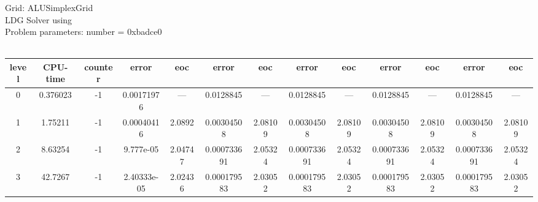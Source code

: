 \documentclass[12pt,english]{article}
\providecommand{\tabularnewline}{\\}
\begin{document}
Grid: ALUSimplexGrid\\
LDG Solver using \\ 
Problem parameters: number = 0xbadce0\\ 
\\ 
\begin{tabular}{|c|c|c||cc||cc||cc||cc||cc|}
\hline 
level & CPU-time & counter & error & eoc  & error & eoc  & error & eoc  & error & eoc  & error & eoc 
 \tabularnewline
\hline
\hline
\hline 
0 & 0.376023 & -1 & 0.00171976 &  ---  & 0.0128845 &  ---  & 0.0128845 &  ---  & 0.0128845 &  ---  & 0.0128845 &  --- 
\tabularnewline
\hline 
\hline 
1 & 1.75211 & -1 & 0.00040416 & 2.0892 & 0.00304508 & 2.08109 & 0.00304508 & 2.08109 & 0.00304508 & 2.08109 & 0.00304508 & 2.08109
\tabularnewline
\hline 
\hline 
2 & 8.63254 & -1 & 9.777e-05 & 2.04747 & 0.000733691 & 2.05324 & 0.000733691 & 2.05324 & 0.000733691 & 2.05324 & 0.000733691 & 2.05324
\tabularnewline
\hline 
\hline 
3 & 42.7267 & -1 & 2.40333e-05 & 2.02436 & 0.000179583 & 2.03052 & 0.000179583 & 2.03052 & 0.000179583 & 2.03052 & 0.000179583 & 2.03052
\tabularnewline
\hline 
\end{tabular}\\
\end{document}
